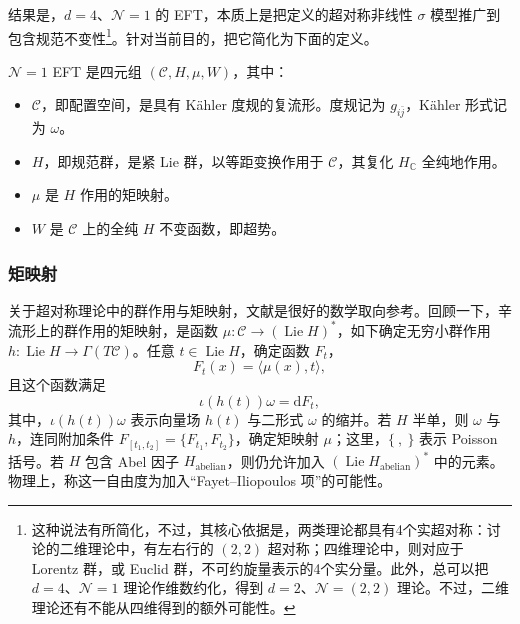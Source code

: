 结果是，$d=4$、$\mathcal{N}=1$ 的 EFT，本质上是把定义的超对称非线性 $\sigma$ 模型推广到包含规范不变性\footnote{这种说法有所简化，不过，其核心依据是，两类理论都具有4个实超对称：讨论的二维理论中，有左右行的 $(2,2)$ 超对称；四维理论中，则对应于 Lorentz 群，或 Euclid 群，不可约旋量表示的4个实分量。此外，总可以把 $d=4$、$\mathcal{N}=1$ 理论作维数约化，得到 $d=2$、$\mathcal{N}=(2,2)$ 理论。不过，二维理论还有不能从四维得到的额外可能性。}。针对当前目的，把它简化为下面的定义。
\begin{definition}\label{def:5.17}
$\mathcal{N}=1$ EFT 是四元组 $(\mathcal{C},H,\mu,W)$，其中：
\begin{itemize}
\item $\mathcal{C}$，即配置空间，是具有 K\"ahler 度规的复流形。度规记为 $g_{i\bar j}$，K\"ahler 形式记为 $\omega$。
\item $H$，即规范群，是紧 Lie 群，以等距变换作用于 $\mathcal{C}$，其复化 $H_{\mathbb{C}}$ 全纯地作用。
\item $\mu$ 是 $H$ 作用的矩映射。
\item $W$ 是 $\mathcal{C}$ 上的全纯 $H$ 不变函数，即超势。
\end{itemize}
\end{definition}

\subsubsection{矩映射}\label{sec:5.4.1.1}

关于超对称理论中的群作用与矩映射，文献是很好的数学取向参考。回顾一下，辛流形上的群作用的矩映射，是函数 $\mu\colon\mathcal{C}\to(\operatorname{Lie}H)^*$，如下确定无穷小群作用 $h\colon\operatorname{Lie}H\to\Gamma(T\mathcal{C})$。任意 $t\in\operatorname{Lie}H$，确定函数 $F_t$，
\[
F_t(x)=\langle\mu(x),t\rangle,
\]
且这个函数满足
\begin{equation}\label{eq:5.75}
\iota(h(t))\omega=\mathrm{d}F_t,
\end{equation}
其中，$\iota(h(t))\omega$ 表示向量场 $h(t)$ 与二形式 $\omega$ 的缩并。若 $H$ 半单，则 $\omega$ 与 $h$，连同附加条件 $F_{[t_1,t_2]}=\{F_{t_1},F_{t_2}\}$，确定矩映射 $\mu$；这里，$\{\ ,\ \}$ 表示 Poisson 括号。若 $H$ 包含 Abel 因子 $H_{\mathrm{abelian}}$，则仍允许加入 $(\operatorname{Lie}H_{\mathrm{abelian}})^*$ 中的元素。物理上，称这一自由度为加入“Fayet--Iliopoulos 项”的可能性。

